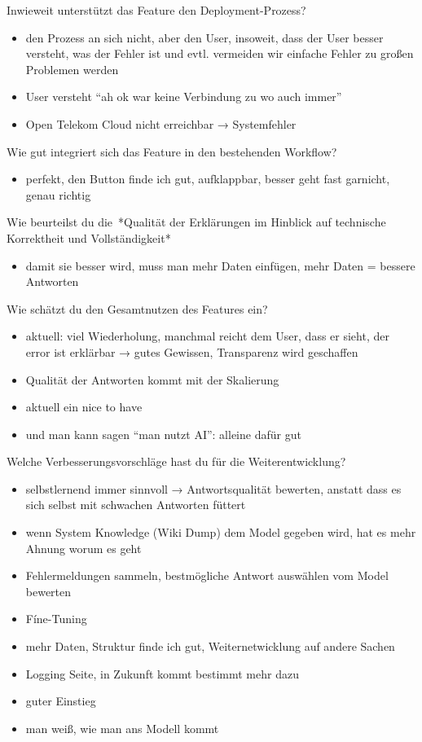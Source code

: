 \documentclass[
  a4paper,
  12pt,
  oneside,
  open=any,
  BCOR=12mm,
  DIV=14,
  parskip=half*,
  headsepline,
  footsepline,
  pointlessnumbers,
  liststotoc,
  numbers=noenddot,
  listof=totoc]{scrartcl}
\providecommand{\tightlist}{%
  \setlength{\itemsep}{0pt}\setlength{\parskip}{0pt}}\usepackage{longtable,booktabs,array}
\begin{document}
Inwieweit unterstützt das Feature den Deployment-Prozess?

\begin{itemize}
\tightlist
\item
  den Prozess an sich nicht, aber den User, insoweit, dass der User
  besser versteht, was der Fehler ist und evtl. vermeiden wir einfache
  Fehler zu großen Problemen werden
\item
  User versteht ``ah ok war keine Verbindung zu wo auch immer''
\item
  Open Telekom Cloud nicht erreichbar → Systemfehler
\end{itemize}

Wie gut integriert sich das Feature in den bestehenden Workflow?

\begin{itemize}
\tightlist
\item
  perfekt, den Button finde ich gut, aufklappbar, besser geht fast
  garnicht, genau richtig
\end{itemize}

Wie beurteilst du die~*Qualität der Erklärungen im Hinblick auf
technische Korrektheit und Vollständigkeit*

\begin{itemize}
\tightlist
\item
  damit sie besser wird, muss man mehr Daten einfügen, mehr Daten =
  bessere Antworten
\end{itemize}

Wie schätzt du den Gesamtnutzen des Features ein?

\begin{itemize}
\tightlist
\item
  aktuell: viel Wiederholung, manchmal reicht dem User, dass er sieht,
  der error ist erklärbar → gutes Gewissen, Transparenz wird geschaffen
\item
  Qualität der Antworten kommt mit der Skalierung
\item
  aktuell ein nice to have
\item
  und man kann sagen ``man nutzt AI'': alleine dafür gut
\end{itemize}

Welche Verbesserungsvorschläge hast du für die Weiterentwicklung?

\begin{itemize}
\tightlist
\item
  selbstlernend immer sinnvoll → Antwortsqualität bewerten, anstatt dass
  es sich selbst mit schwachen Antworten füttert
\item
  wenn System Knowledge (Wiki Dump) dem Model gegeben wird, hat es mehr
  Ahnung worum es geht
\item
  Fehlermeldungen sammeln, bestmögliche Antwort auswählen vom Model
  bewerten
\item
  Fíne-Tuning
\item
  mehr Daten, Struktur finde ich gut, Weiternetwicklung auf andere
  Sachen
\item
  Logging Seite, in Zukunft kommt bestimmt mehr dazu
\item
  guter Einstieg
\item
  man weiß, wie man ans Modell kommt
\end{itemize}
\end{document}
